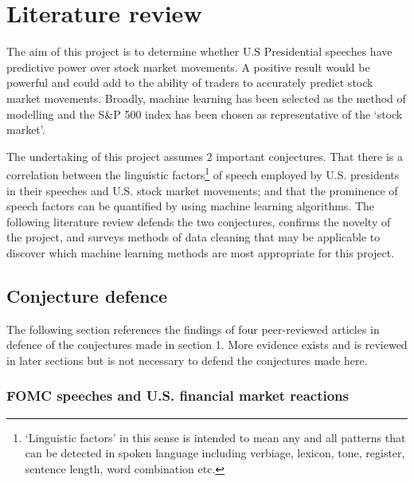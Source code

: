 \documentclass[11pt,preprint, authoryear]{elsarticle}
\numberwithin{equation}{section}
\numberwithin{figure}{section}
\numberwithin{table}{section}
\let\rmarkdownfootnote\footnote%
\def\footnote{\protect\rmarkdownfootnote}
\begin{document}
\hypertarget{literature-review}{%
\section{\texorpdfstring{Literature review
\label{Literature review}}{Literature review }}\label{literature-review}}

The aim of this project is to determine whether U.S Presidential
speeches have predictive power over stock market movements. A positive
result would be powerful and could add to the ability of traders to
accurately predict stock market movements. Broadly, machine learning has
been selected as the method of modelling and the S\&P 500 index has been
chosen as representative of the `stock market'.

The undertaking of this project assumes 2 important conjectures. That
there is a correlation between the linguistic factors\footnote{`Linguistic
  factors' in this sense is intended to mean any and all patterns that
  can be detected in spoken language including verbiage, lexicon, tone,
  register, sentence length, word combination etc.} of speech employed
by U.S. presidents in their speeches and U.S. stock market movements;
and that the prominence of speech factors can be quantified by using
machine learning algorithms. The following literature review defends the
two conjectures, confirms the novelty of the project, and surveys
methods of data cleaning that may be applicable to discover which
machine learning methods are most appropriate for this project.

\hypertarget{conjecture-defence}{%
\subsection{\texorpdfstring{Conjecture defence
\label{Conjecture defence}}{Conjecture defence }}\label{conjecture-defence}}

The following section references the findings of four peer-reviewed
articles in defence of the conjectures made in section 1. More evidence
exists and is reviewed in later sections but is not necessary to defend
the conjectures made here.

\hypertarget{fomc-speeches-and-u.s.-financial-market-reactions}{%
\subsubsection{\texorpdfstring{FOMC speeches and U.S. financial market
reactions
\label{FOMC speeches}}{FOMC speeches and U.S. financial market reactions }}\label{fomc-speeches-and-u.s.-financial-market-reactions}}
\end{document}
